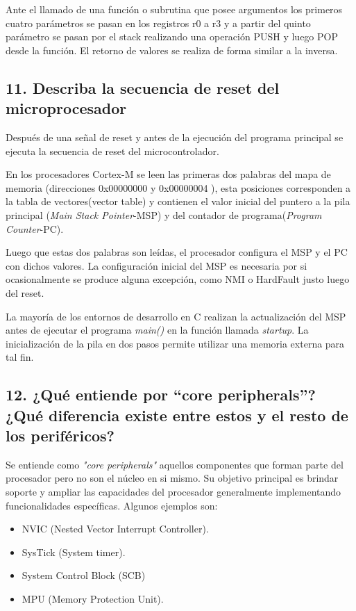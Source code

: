 \documentclass[10pt,a4paper,twoside,spanish]{article}	%
\begin{document}
Ante el llamado de una función o subrutina que posee argumentos los primeros cuatro parámetros se pasan en los registros r0 a r3 y a partir del quinto parámetro se pasan por el stack realizando una operación PUSH y luego POP desde la función. El retorno de valores se realiza de forma similar a la inversa.   

\subsection*{11. Describa la secuencia de reset del microprocesador}

Después de una señal de reset y antes de la ejecución del programa principal se ejecuta la secuencia de reset del microcontrolador.
 
En los procesadores Cortex-M se leen las primeras dos palabras del mapa de memoria (direcciones 0x00000000 y 0x00000004 ), esta posiciones corresponden a la tabla de vectores(vector table) y contienen el valor inicial del puntero a la pila principal (\textit{Main Stack Pointer}-MSP) y del contador de programa(\textit{Program Counter}-PC).

Luego que estas dos palabras son leídas, el procesador configura el MSP y el PC con dichos valores. La configuración inicial del MSP es necesaria por si ocasionalmente se produce alguna excepción, como NMI o HardFault justo luego del reset.

La mayoría de los entornos de desarrollo en C realizan la actualización del MSP antes de ejecutar el programa \textit{main()} en la función llamada \textit{startup}. La inicialización de la pila en dos pasos permite utilizar una memoria externa para tal fin. 



\subsection*{12. ¿Qué entiende por “core peripherals”? ¿Qué diferencia existe entre estos y el resto de los periféricos?}

Se entiende como \textit{"core peripherals"} aquellos componentes que forman parte del procesador pero no son el núcleo en si mismo. Su objetivo principal es brindar soporte y ampliar las capacidades del procesador generalmente implementando funcionalidades específicas. Algunos ejemplos son:
\begin{itemize}

\item NVIC (Nested Vector Interrupt Controller).
\item SysTick (System timer).
\item System Control Block (SCB)
\item MPU (Memory Protection Unit).
\end{itemize}
\end{document}
